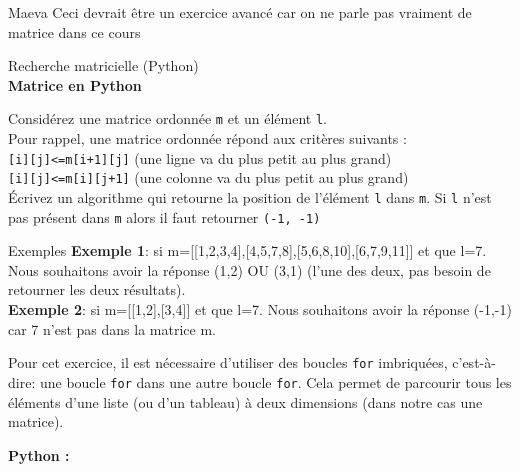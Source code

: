 \begin{note}{Maeva}
    Ceci devrait être un exercice avancé car on ne parle pas vraiment de matrice dans ce cours 
\end{note}
\begin{Exercice}[20 minutes] Recherche matricielle (Python) \optionnel\\
    
    \textbf{Matrice en Python}

    Considérez une matrice ordonnée \lstinline{m} et un élément \lstinline{l}.\\
    
    Pour rappel, une matrice ordonnée répond aux critères suivants :\\
     \lstinline{[i][j]<=m[i+1][j]} (une ligne va du plus petit au plus grand)\\
     \lstinline{[i][j]<=m[i][j+1]} (une colonne va du plus petit au plus grand)\\
 
    
    Écrivez un algorithme qui retourne la position de l’élément \lstinline{l} dans \lstinline{m}. Si \lstinline{l} n’est pas présent dans \lstinline{m} alors il faut retourner \lstinline{(-1, -1)}\\
    
    \begin{Example}{\faTerminal \quad Exemples}
        \textbf{Exemple 1}: si m=[[1,2,3,4],[4,5,7,8],[5,6,8,10],[6,7,9,11]] et que l=7. Nous souhaitons avoir la réponse (1,2) OU (3,1) (l’une des deux, pas besoin de retourner les deux résultats).\\

        \textbf{Exemple 2}: si m=[[1,2],[3,4]] et que l=7. Nous souhaitons avoir la réponse (-1,-1) car 7 n’est pas dans la matrice m.
    \end{Example}

    

    \begin{conseil}
    Pour cet exercice, il est nécessaire d'utiliser des boucles \lstinline{for} imbriquées, c'est-à-dire: une boucle \lstinline{for} dans une autre boucle \lstinline{for}. Cela permet de parcourir tous les éléments d'une liste (ou d'un tableau) à deux dimensions (dans notre cas une matrice). 
    \end{conseil}

    \begin{solution}
        \textbf{Python :}
        
    \end{solution}

\end{Exercice}

